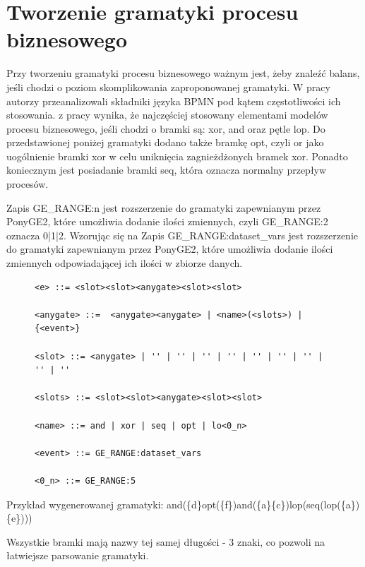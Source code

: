 \section{Tworzenie gramatyki procesu biznesowego}

Przy tworzeniu gramatyki procesu biznesowego ważnym jest, żeby znaleźć balans, jeśli chodzi o poziom skomplikowania zaproponowanej
gramatyki.  W pracy \cite{10.1007/978-3-540-69534-9_35} autorzy przeanalizowali składniki języka BPMN pod kątem częstotliwości ich stosowania. z pracy wynika, że najczęściej stosowany elementami modelów procesu biznesowego, jeśli chodzi o bramki są: xor, and oraz pętle lop. Do przedstawionej poniżej gramatyki dodano także bramkę opt, czyli or jako uogólnienie bramki xor w celu uniknięcia zagnieżdżonych bramek xor. Ponadto koniecznym jest posiadanie bramki seq, która oznacza normalny przepływ procesów.

Zapis GE{\_}RANGE:n jest rozszerzenie do gramatyki zapewnianym przez PonyGE2, które umożliwia dodanie ilości zmiennych, czyli GE{\_}RANGE:2 oznacza 0|1|2.
Wzorując się na  Zapis GE{\_}RANGE:dataset{\_}vars jest rozszerzenie do gramatyki zapewnianym przez PonyGE2, które umożliwia dodanie ilości zmiennych odpowiadającej ich ilości w zbiorze danych.

\begin{figure}[!ht]
\lstset{caption=Gramatyka procesu biznesowego, captionpos=b}
\lstset{label=src:grammar, frame=single}
\begin{lstlisting}
<e> ::= <slot><slot><anygate><slot><slot>

<anygate> ::=  <anygate><anygate> | <name>(<slots>) | {<event>}

<slot> ::= <anygate> | '' | '' | '' | '' | '' | '' | '' | '' | ''

<slots> ::= <slot><slot><anygate><slot><slot>

<name> ::= and | xor | seq | opt | lo<0_n>

<event> ::= GE_RANGE:dataset_vars

<0_n> ::= GE_RANGE:5
\end{lstlisting}
\end{figure}

Przykład wygenerowanej gramatyki:
and(\{d\}opt(\{f\})and(\{a\}\{c\})lop(seq(lop(\{a\})\{e\})))

Wszystkie bramki mają nazwy tej samej długości - 3 znaki, co pozwoli na łatwiejsze parsowanie gramatyki.

